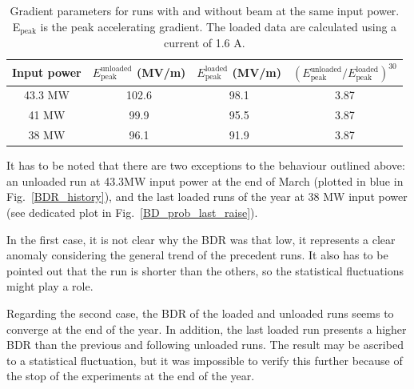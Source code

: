 \begin{table}[h]
  \centering
    \begin{tabular}{ c c c c }
    \hline
    \hline
    Input power 		&		$E^\text{unloaded} _\text{peak}$ (MV/m)		& 	$E^\text{loaded} _\text{peak}$ (MV/m)		&	$\left ( E^\text{unloaded} _\text{peak} / E^\text{loaded} _\text{peak} \right )^{30}$	\\
    \hline
    43.3 MW		&		102.6 								&	98.1									&	3.87		\\
    41 MW			&		99.9 									&	95.5									&	3.87		\\
    38 MW			&		96.1 									&	91.9									&	3.87		\\
    \hline
    \hline
    \end{tabular}
\caption{Gradient parameters for runs with and without beam at the same input power. E$_\text{peak}$ is the peak accelerating gradient. The loaded data are calculated using a current of 1.6 A.}
\label{param_var_p}
\end{table}

It has to be noted that there are two exceptions to the behaviour outlined above: an unloaded run at 43.3MW input power at the end of March (plotted in blue in Fig.~\ref{BDR_history}), and the last loaded runs of the year at 38 MW input power (see dedicated plot in Fig.~\ref{BD_prob_last_raise}). 

In the first case, it is not clear why the BDR was that low, it represents a clear anomaly considering the general trend of the precedent runs. It also has to be pointed out that the run is shorter than the others, so the statistical fluctuations might play a role.

Regarding the second case, the BDR of the loaded and unloaded runs seems to converge at the end of the year. In addition, the last loaded run presents a higher BDR than the previous and following unloaded runs. The result may be ascribed to a statistical fluctuation, but  it was impossible to verify this further because of the stop of the experiments at the end of the year.

